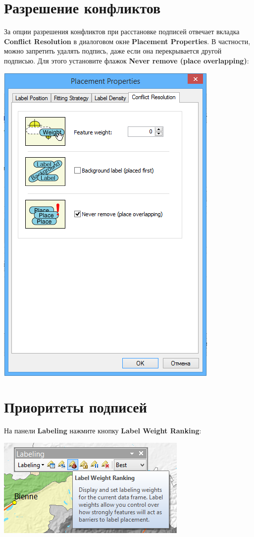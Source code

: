 \documentclass[12pt,]{book}
\begin{document}
\hypertarget{section-32}{%
\section{Разрешение конфликтов}\label{section-32}}

За опции разрешения конфликтов при расстановке подписей отвечает вкладка \textbf{Conflict Resolution} в диалоговом окне \textbf{Placement Properties}. В частности, можно запретить удалять подпись, даже если она перекрывается другой подписью. Для этого установите флажок \textbf{Never remove (place overlapping)}:

\includegraphics{images/Appendix/image49.png}

\hypertarget{section-33}{%
\section{Приоритеты подписей}\label{section-33}}

На панели \textbf{Labeling} нажмите кнопку \textbf{Label Weight Ranking}:

\includegraphics{images/Appendix/image50.png}
\end{document}
